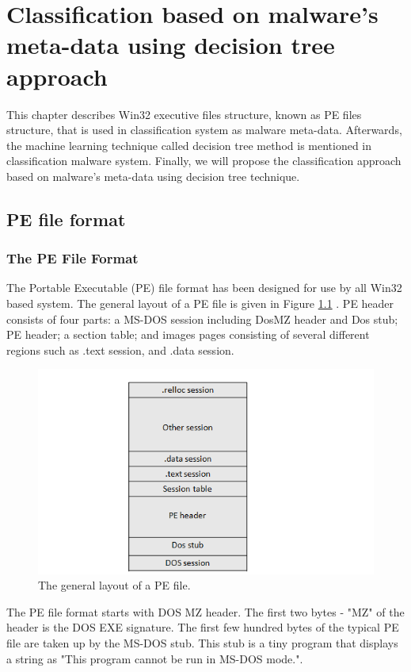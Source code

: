 \chapter{Classification based on malware's meta-data using decision tree approach}\label{chap:4}
%
%
This chapter describes Win32 executive files structure, known as PE files structure, that is used in classification system as malware meta-data. Afterwards, the machine learning technique called decision tree method is mentioned in classification malware system. Finally, we will propose the classification approach based on malware's meta-data using decision tree technique. 

\section{PE file format\cite{peheaderci}}
\subsection{The PE File Format}

The Portable Executable (PE) file format has been designed for use by all Win32 based system. The general layout of a PE file is given in Figure \ref{fig:pefiles} . PE header consists of four parts: a MS-DOS session including DosMZ header and Dos stub; PE header; a section table; and images pages consisting of several different regions such as .text session, and .data session.
\begin{figure}[h!]
\centering
\includegraphics[width=1\textwidth]{graph/pefiles.png}
\caption{The general layout of a PE file.}
\label{fig:pefiles}
\end{figure}

The PE file format starts with DOS MZ header. The first two bytes - "MZ" of the header is the DOS EXE signature. The first few hundred bytes of the typical PE file are taken up by the MS-DOS stub. This stub is a tiny program that displays a string as "This program cannot be run in MS-DOS mode.". 


